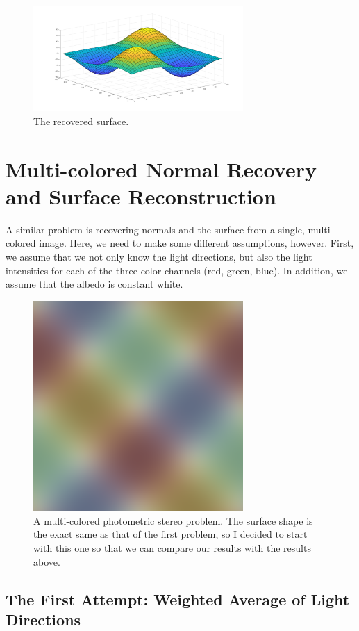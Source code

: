 \documentclass{article}
\begin{document}
\begin{figure}[!ht]
	\centering
	\includegraphics[width=80mm]{figs/q1_surface_plot.png}
	\caption{The recovered surface.}
\end{figure}

\section{Multi-colored Normal Recovery and Surface Reconstruction}

A similar problem is recovering normals and the surface from a single, 
multi-colored image. Here, we need to make some different assumptions, however. 
First, we assume that we not only know the light directions, but also the light 
intensities for each of the three color channels (red, green, blue). In addition, 
we assume that the albedo is constant white.

\begin{figure}[!ht]
	\centering
	\includegraphics[width=80mm]{figs/color_photometric_stereo_2.png}
	\caption{A multi-colored photometric stereo problem. The surface shape 
        is the exact same as that of the first problem, so I decided to start 
        with this one so that we can compare our results with the results 
        above.}
\end{figure}

\subsection{The First Attempt: Weighted Average of Light Directions}
\end{document}
